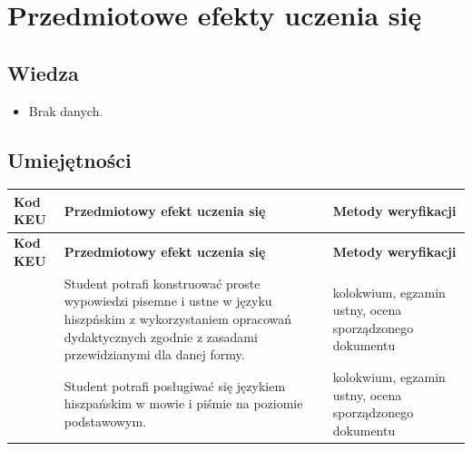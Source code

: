 \documentclass[12pt, a4paper]{article}
\newcommand{\thdrule}{\noalign{\global\setlength{\extrarowheight}{0pt}}}
\newcommand{\thdend}{\noalign{\global\setlength{\extrarowheight}{3pt}}}
\begin{document}
\section{Przedmiotowe efekty uczenia się}

\subsection*{Wiedza}
\begin{itemize}
  \item Brak danych.
\end{itemize}

\subsection*{Umiejętności}
{\scriptsize
\begin{longtable}{m{1.6cm}m{9.0cm}m{4.2cm}}
\thdrule\toprule
\rowcolor{pjatkRed} {\color{white}\footnotesize\textbf{\vphantom{Ag}Kod KEU}} & {\color{white}\footnotesize\textbf{\vphantom{Ag}Przedmiotowy efekt uczenia się}} & {\color{white}\footnotesize\textbf{\vphantom{Ag}Metody weryfikacji}} \\
\midrule\thdend
\endfirsthead
\thdrule\toprule
\rowcolor{pjatkRed} {\color{white}\footnotesize\textbf{\vphantom{Ag}Kod KEU}} & {\color{white}\footnotesize\textbf{\vphantom{Ag}Przedmiotowy efekt uczenia się}} & {\color{white}\footnotesize\textbf{\vphantom{Ag}Metody weryfikacji}} \\
\midrule\thdend
\endhead
  \rowcolor{tableRowLight}  & Student potrafi konstruować proste wypowiedzi pisemne i ustne w języku hiszpńskim z wykorzystaniem opracowań dydaktycznych zgodnie z zasadami przewidzianymi dla danej formy. & kolokwium, egzamin ustny, ocena sporządzonego dokumentu \\
  \rowcolor{tableRowAlt}  & Student potrafi posługiwać się językiem hiszpańskim w mowie i piśmie na poziomie podstawowym. & kolokwium, egzamin ustny, ocena sporządzonego dokumentu \\
\bottomrule
\end{longtable}}
\end{document}
